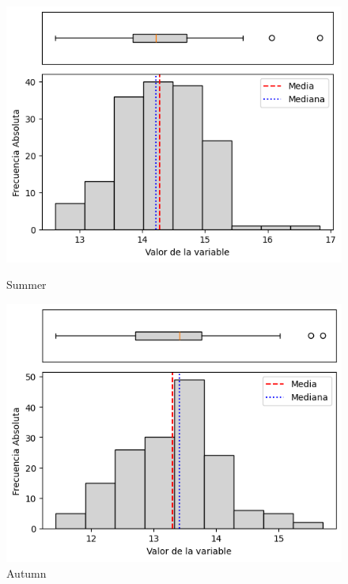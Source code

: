 \begin{figure}[htbp]
\centering
\begin{minipage}{0.30\textwidth}
  \includegraphics[width=\linewidth]{resultados/por_estacion_del_anio/boxplot_clases_por_estacion/Andahuaylas/T_HistBoxplot_Summer.png}
  \caption*{Summer}
\end{minipage}
\hfill
\begin{minipage}{0.30\textwidth}
  \includegraphics[width=\linewidth]{resultados/por_estacion_del_anio/boxplot_clases_por_estacion/Andahuaylas/T_HistBoxplot_Autumn.png}
  \caption*{Autumn}
\end{minipage}

\vspace{0.2cm}


\end{figure}
